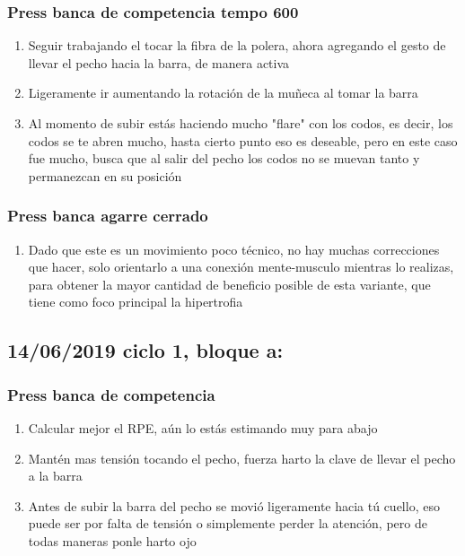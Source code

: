 \documentclass[11pt]{article}
\begin{document}
\subsubsection{Press banca de competencia tempo 600}
\label{sec:orgb70b22e}
\begin{enumerate}
\item Seguir trabajando el tocar la fibra de la polera, ahora agregando
el gesto de llevar el pecho hacia la barra, de manera activa
\item Ligeramente ir aumentando la rotación de la muñeca al tomar la
barra
\item Al momento de subir estás haciendo mucho "flare" con los codos, es
decir, los codos se te abren mucho, hasta cierto punto eso es
deseable, pero en este caso fue mucho, busca que al salir del pecho
los codos no se muevan tanto y permanezcan en su posición
\end{enumerate}
\subsubsection{Press banca agarre cerrado}
\label{sec:org8613144}
\begin{enumerate}
\item Dado que este es un movimiento poco técnico, no hay muchas
correcciones que hacer, solo orientarlo a una conexión
mente-musculo mientras lo realizas, para obtener la mayor cantidad
de beneficio posible de esta variante, que tiene como foco
principal la hipertrofia
\end{enumerate}

\subsection{14/06/2019 ciclo 1, bloque a:}
\label{sec:org57aea8f}
\subsubsection{Press banca de competencia}
\label{sec:orgca828b9}
\begin{enumerate}
\item Calcular mejor el RPE, aún lo estás estimando muy para abajo
\item Mantén mas tensión tocando el pecho, fuerza harto la clave de llevar el pecho a la barra
\item Antes de subir la barra del pecho se movió ligeramente hacia tú
cuello, eso puede ser por falta de tensión o simplemente perder la
atención, pero de todas maneras ponle harto ojo
\end{enumerate}
\end{document}
